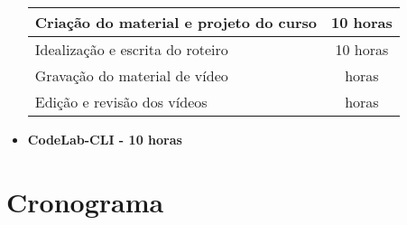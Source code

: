 \documentclass[10pt,twoside,a4paper]{article}
\begin{document}
\begin{itemize}
        \begin{center}
            \begin{tabular}{ |l|c| } 
                \hline
                     Criação do material e projeto do curso & 10 horas \\
                     \hline
                     Idealização e escrita do roteiro & 10 horas \\
                     \hline
                     Gravação do material de vídeo &  horas \\
                     \hline
                     Edição e revisão dos vídeos &  horas \\
                \hline
            \end{tabular}
        \end{center}
        
    \item \textbf{CodeLab-CLI - 10 horas} \\
        
        
  \end{itemize}
  
\section{Cronograma}
\end{document}
